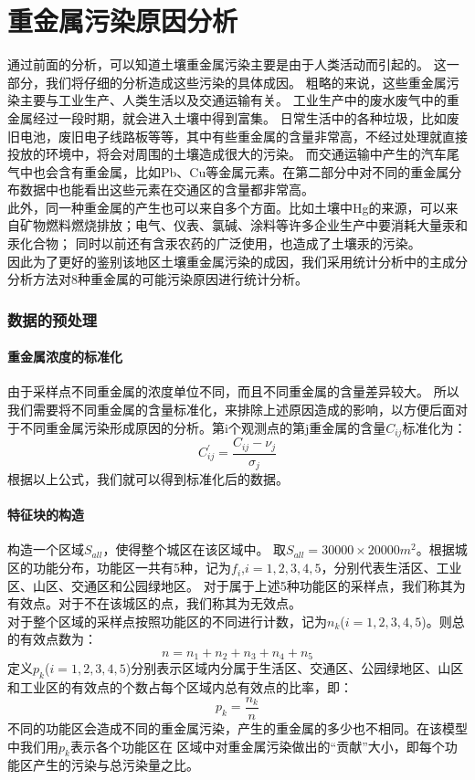 \documentclass[a4paper]{article}
\begin{document}
\part{重金属污染原因分析}
通过前面的分析，可以知道土壤重金属污染主要是由于人类活动而引起的。
这一部分，我们将仔细的分析造成这些污染的具体成因。
粗略的来说，这些重金属污染主要与工业生产、人类生活以及交通运输有关。
工业生产中的废水废气中的重金属经过一段时期，就会进入土壤中得到富集。
日常生活中的各种垃圾，比如废旧电池，废旧电子线路板等等，其中有些重金属的含量非常高，不经过处理就直接投放的环境中，将会对周围的土壤造成很大的污染。
而交通运输中产生的汽车尾气中也会含有重金属，比如Pb、Cu等金属元素。在第二部分中对不同的重金属分布数据中也能看出这些元素在交通区的含量都非常高。 \\
此外，同一种重金属的产生也可以来自多个方面。比如土壤中Hg的来源，可以来自矿物燃料燃烧排放；电气、仪表、氯碱、涂料等许多企业生产中要消耗大量汞和汞化合物；
同时以前还有含汞农药的广泛使用，也造成了土壤汞的污染。  \\
\indent 因此为了更好的鉴别该地区土壤重金属污染的成因，我们采用统计分析中的主成分分析方法对8种重金属的可能污染原因进行统计分析。
\section{数据的预处理}
\subsection{重金属浓度的标准化}
\indent 由于采样点不同重金属的浓度单位不同，而且不同重金属的含量差异较大。
所以我们需要将不同重金属的含量标准化，来排除上述原因造成的影响，以方便后面对于不同重金属污染形成原因的分析。第i个观测点的第j重金属的含量$C_{ij}$标准化为：
\begin{equation}
C_{ij}^{\prime}=\frac{C_{ij}-\nu_{j}}{\sigma_{j}}
\end{equation}
根据以上公式，我们就可以得到标准化后的数据。
\subsection{特征块的构造}
构造一个区域$S_{all}$，使得整个城区在该区域中。
取$S_{all}=30000\times20000m^2$。根据城区的功能分布，功能区一共有5种，记为$f_i$,$i=1,2,3,4,5$，分别代表生活区、工业区、山区、交通区和公园绿地区。
对于属于上述5种功能区的采样点，我们称其为有效点。对于不在该城区的点，我们称其为无效点。\\
\indent 对于整个区域的采样点按照功能区的不同进行计数，记为$n_k$($i=1,2,3,4,5$)。则总的有效点数为：
\begin{equation}
n=n_1+n_2+n_3+n_4+n_5
\end{equation}
\indent 定义$p_k$($i=1,2,3,4,5$)分别表示区域内分属于生活区、交通区、公园绿地区、山区和工业区的有效点的个数占每个区域内总有效点的比率，即：
\begin{equation}
p_k=\frac{n_k}{n}
\end{equation}
不同的功能区会造成不同的重金属污染，产生的重金属的多少也不相同。在该模型中我们用$p_k$表示各个功能区在
区域中对重金属污染做出的“贡献”大小，即每个功能区产生的污染与总污染量之比。
\end{document}
